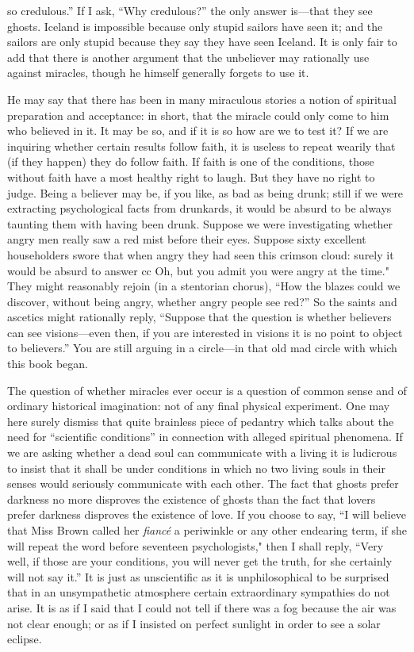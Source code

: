 \documentclass{book}
\begin{document}
so credulous.” If I ask, “Why credulous?” the only answer is—that they see ghosts. Iceland is impossible because only stupid sailors have seen it; and the sailors are only stupid because they say they have seen Iceland. It is only fair to add that there is another argument that the unbeliever may rationally use against miracles, though he himself generally forgets to use it.

He may say that there has been in many miraculous stories a notion of spiritual preparation and acceptance: in short, that the miracle could only come to him who believed in it. It may be so, and if it is so how are we to test it? If we are inquiring whether certain results follow faith, it is useless to repeat wearily that (if they happen) they do follow faith. If faith is one of the conditions, those without faith have a most healthy right to laugh. But they have no right to judge. Being a believer may be, if you like, as bad as being drunk; still if we were extracting psychological facts from drunkards, it would be absurd to be always taunting them with having been drunk. Suppose we were investigating whether angry men really saw a red mist before their eyes. Suppose sixty excellent householders swore that when angry they had seen this crimson cloud: surely it would be absurd to answer cc Oh, but you admit you were angry at the time." They might reasonably rejoin (in a stentorian chorus), “How the blazes could we discover, without being angry, whether angry people see red?” So the saints and ascetics might rationally reply, “Suppose that the question is whether believers can see visions—even then, if you are interested in visions it is no point to object to believers.” You are still arguing in a circle—in that old mad circle with which this book began.

The question of whether miracles ever occur is a question of common sense and of ordinary historical imagination: not of any final physical experiment. One may here surely dismiss that quite brainless piece of pedantry which talks about the need for “scientific conditions” in connection with alleged spiritual phenomena. If we are asking whether a dead soul can communicate with a living it is ludicrous to insist that it shall be under conditions in which no two living souls in their senses would seriously communicate with each other. The fact that ghosts prefer darkness no more disproves the existence of ghosts than the fact that lovers prefer darkness disproves the existence of love. If you choose to say, “I will believe that Miss Brown called her \emph{fiancé} a periwinkle or any other endearing term, if she will repeat the word before seventeen psychologists," then I shall reply, “Very well, if those are your conditions, you will never get the truth, for she certainly will not say it.” It is just as unscientific as it is unphilosophical to be surprised that in an unsympathetic atmosphere certain extraordinary sympathies do not arise. It is as if I said that I could not tell if there was a fog because the air was not clear enough; or as if I insisted on perfect sunlight in order to see a solar eclipse.
\end{document}
